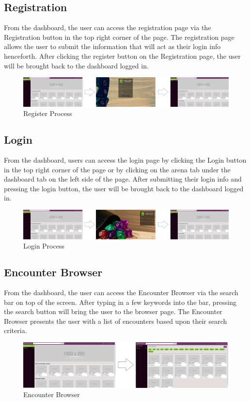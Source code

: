 \documentclass[12pt,a4paper]{report}
\begin{document}
		\subsection{Registration}
		From the dashboard, the user can access the registration page via the Registration button in the top right corner of the page. The registration page allows the user to submit the information that will act as their login info henceforth. After clicking the register button on the Registration page, the user will be brought back to the dashboard logged in.
		\begin{figure}[H]
			\centering
			\centerline{\includegraphics[scale=.08]{registerNav}}
			\caption{Register Process}
			\label{fig: Register Page}
		\end{figure}
		\subsection{Login}
		From the dashboard, users can access the login page by clicking the Login button in the top right corner of the page or by clicking on the arena tab under the dashboard tab on the left side of the page. After submitting their login info and pressing the login button, the user will be brought back to the dashboard logged in. 
		\begin{figure}[H]
			\centering
			\centerline{\includegraphics[scale=.11]{loginNav}}
			\caption{Login Process}
			\label{fig: Login Page}
		\end{figure}
		\newpage
		\subsection{Encounter Browser}
		From the dashboard, the user can access the Encounter Browser via the search bar on top of the screen. After typing in a few keywords into the bar, pressing the search button will bring the user to the browser page. The Encounter Browser presents the user with a list of encounters based upon their search criteria. 
		\begin{figure}[H]
			\centering
			\centerline{\includegraphics[scale=.16]{browserNav}}
			\caption{Encounter Browser}
			\label{fig: Dashboard to Browser}
		\end{figure}
\end{document}

